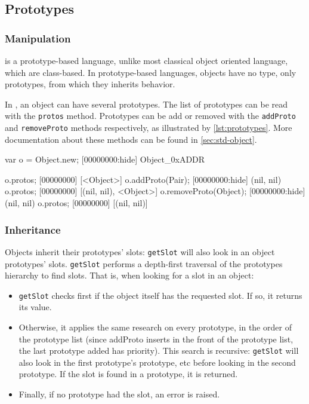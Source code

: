 \subsection{Prototypes}

\subsubsection{Manipulation}

\us is a prototype-based language, unlike most classical object
oriented language, which are class-based. In prototype-based
languages, objects have no type, only prototypes, from which they
inherits behavior.

In \us, an object can have several prototypes. The list of prototypes
can be read with the \lstinline|protos| method. Prototypes can be add
or removed with the \lstinline|addProto| and \lstinline|removeProto|
methods respectively, as illustrated by \autoref{lst:prototypes}. More
documentation about these methods can be found in \autoref{sec:std-object}.

\begin{urbiscript}[caption=Manipulating prototypes, label=lst:prototypes,
  float=\floatpos]
var o = Object.new;
[00000000:hide] Object_0xADDR

o.protos;
[00000000] [<Object>]
o.addProto(Pair);
[00000000:hide] (nil, nil)
o.protos;
[00000000] [(nil, nil), <Object>]
o.removeProto(Object);
[00000000:hide] (nil, nil)
o.protos;
[00000000] [(nil, nil)]
\end{urbiscript}

\subsubsection{Inheritance}

Objects inherit their prototypes' slots: \lstinline|getSlot| will also
look in an object prototypes' slots. \lstinline|getSlot| performs a
depth-first traversal of the prototypes hierarchy to find slots. That
is, when looking for a slot in an object:

\begin{itemize}
\item \lstinline|getSlot| checks first if the object itself has the
  requested slot. If so, it returns its value.
\item Otherwise, it applies the same research on every prototype, in
  the order of the prototype list (since addProto inserts in the front
  of the prototype list, the last prototype added has priority). This
  search is recursive: \lstinline|getSlot| will also look in the first
  prototype's prototype, etc before looking in the second
  prototype. If the slot is found in a prototype, it is returned.
\item Finally, if no prototype had the slot, an error is raised.
\end{itemize}

